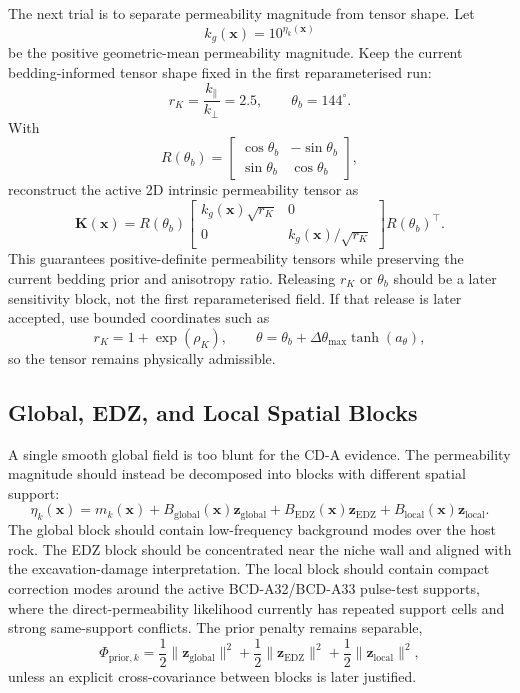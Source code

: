 \documentclass[10pt,a4paper]{article}
\newcommand{\K}{\bm K}
\begin{document}
The next trial is to separate permeability magnitude from tensor shape.  Let
\[
  k_g(\bm x)=10^{\eta_k(\bm x)}
\]
be the positive geometric-mean permeability magnitude.  Keep the current
bedding-informed tensor shape fixed in the first reparameterised run:
\[
  r_K=\frac{k_\parallel}{k_\perp}=2.5,\qquad
  \theta_b=144^\circ .
\]
With
\[
R(\theta_b)=
\begin{bmatrix}
\cos\theta_b & -\sin\theta_b\\
\sin\theta_b & \cos\theta_b
\end{bmatrix},
\]
reconstruct the active 2D intrinsic permeability tensor as
\[
  \K(\bm x)=
  R(\theta_b)
  \begin{bmatrix}
  k_g(\bm x)\sqrt{r_K} & 0\\
  0 & k_g(\bm x)/\sqrt{r_K}
  \end{bmatrix}
  R(\theta_b)^\top .
\]
This guarantees positive-definite permeability tensors while preserving the
current bedding prior and anisotropy ratio.  Releasing \(r_K\) or \(\theta_b\)
should be a later sensitivity block, not the first reparameterised field.  If that
release is later accepted, use bounded coordinates such as
\[
  r_K=1+\exp(\rho_K),\qquad
  \theta=\theta_b+\Delta\theta_{\max}\tanh(a_\theta),
\]
so the tensor remains physically admissible.

\subsection{Global, EDZ, and Local Spatial Blocks}

A single smooth global field is too blunt for the CD-A evidence.  The permeability
magnitude should instead be decomposed into blocks with different spatial support:
\[
  \eta_k(\bm x)
  =m_k(\bm x)
  +B_{\mathrm{global}}(\bm x)\bm z_{\mathrm{global}}
  +B_{\mathrm{EDZ}}(\bm x)\bm z_{\mathrm{EDZ}}
  +B_{\mathrm{local}}(\bm x)\bm z_{\mathrm{local}} .
\]
The global block should contain low-frequency background modes over the host rock.
The EDZ block should be concentrated near the niche wall and aligned with the
excavation-damage interpretation.  The local block should contain compact
correction modes around the active BCD-A32/BCD-A33 pulse-test supports, where the
direct-permeability likelihood currently has repeated support cells and strong
same-support conflicts.  The prior penalty remains separable,
\[
  \Phi_{\mathrm{prior},k}
  =\frac12\|\bm z_{\mathrm{global}}\|^2
  +\frac12\|\bm z_{\mathrm{EDZ}}\|^2
  +\frac12\|\bm z_{\mathrm{local}}\|^2 ,
\]
unless an explicit cross-covariance between blocks is later justified.
\end{document}
